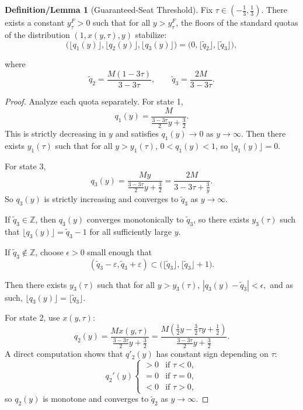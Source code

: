 \documentclass[11pt]{article}
\theoremstyle{definition}
\newtheorem{deflem}[theorem]{Definition/Lemma}
\theoremstyle{definition}
\begin{document}
\begin{deflem}[Guaranteed-Seat Threshold]\label{y_tau.def}
Fix $\tau \in (-\tfrac{1}{3}, \tfrac{1}{3})$. There exists a constant $y_{\tau}^F > 0$ such that for all $y > y_{\tau}^F$, the floors of the standard quotas of the distribution $(1, x(y,\tau), y)$ stabilize:
$$\bigl(\lfloor q_1(y)\rfloor, \lfloor q_2(y)\rfloor, \lfloor q_3(y)\rfloor\bigr)
=\bigl(0, \lfloor \tilde q_2 \rfloor, \lfloor \tilde q_3 \rfloor \bigr),$$

where
$$\tilde q_2 = \frac{M(1-3\tau)}{3-3\tau}, \qquad \tilde q_3 = \frac{2M}{3-3\tau}.$$
\end{deflem}

\begin{proof}
Analyze each quota separately. For state 1,
$$ q_1(y) = \frac{M}{\frac{3-3\tau}{2}y + \frac{3}{2}}.$$
This is strictly decreasing in $y$ and satisfies $q_1(y) \to 0$ as $y \to \infty$. Then there exists $y_1(\tau)$ such that for all $y > y_1(\tau)$,
$0 < q_1(y) < 1$, so $\lfloor q_1(y) \rfloor = 0$.

For state 3, 
$$q_3(y) = \frac{My}{\frac{3-3\tau}{2}y + \frac{3}{2}}= \frac{2M}{3-3\tau + \frac{3}{y}}.$$
So $q_3(y)$ is strictly increasing and converges to $\tilde q_3$ as $y \to \infty$.

If $\tilde q_3 \in \mathbb{Z}$, then $q_3(y)$ converges monotonically to $\tilde q_3$, so there exists $y_3(\tau)$ such that $\lfloor q_3(y) \rfloor = \tilde q_3 - 1$ for all sufficiently large $y$. 

If $\tilde q_3 \notin \mathbb{Z}$, choose $\epsilon > 0$ small enough that
$$(\tilde q_3 - \varepsilon, \tilde q_3 + \varepsilon)
\subset \bigl(\lfloor \tilde q_3 \rfloor, \lfloor \tilde q_3 \rfloor + 1\bigr).$$

Then there exists $y_3(\tau)$ such that for all $y > y_3(\tau)$,
$|q_3(y) - \tilde q_3| < \epsilon,$ and as such, $\lfloor q_3(y) \rfloor = \lfloor \tilde q_3 \rfloor.$


For state 2, use $x(y,\tau)$:
$$
q_2(y) = \frac{Mx(y,\tau)}{\frac{3-3\tau}{2}y + \frac{3}{2}}
= \frac{M\left(\frac{1}{2}y - \frac{3}{2}\tau y + \frac{1}{2}\right)}{\frac{3-3\tau}{2}y + \frac{3}{2}}.
$$
A direct computation shows that $q'_2(y)$ has constant sign depending on $\tau$:
$$q_2'(y)
\begin{cases}
>0 & \text{if } \tau < 0,\\
=0 & \text{if } \tau = 0,\\
<0 & \text{if } \tau > 0,
\end{cases}
$$
so $q_2(y)$ is monotone and converges to $\tilde{q}_2$ as $y \to \infty$.


\end{proof}
\end{document}

